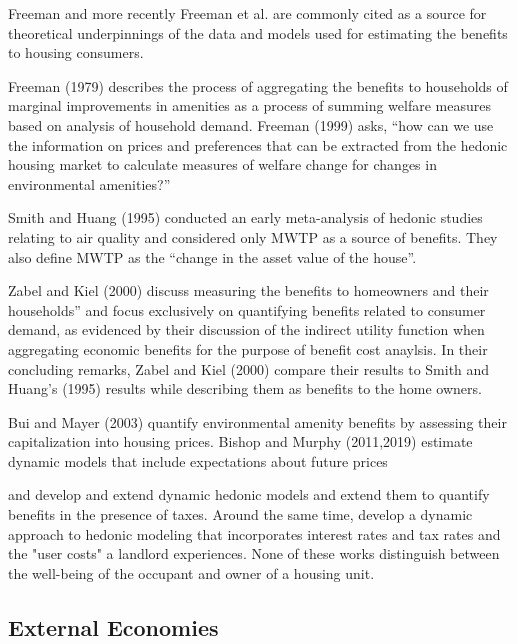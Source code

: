\documentclass[ecta,nameyear,draft]{econsocart}
\theoremstyle{plain}
\theoremstyle{remark}
\begin{document}
Freeman and more recently Freeman et al. are commonly cited as a source for theoretical underpinnings of the data and models used for estimating the benefits to housing consumers.  

Freeman (1979) describes the process of aggregating the benefits to households of marginal improvements in amenities as a process of summing welfare measures based on analysis of household demand. Freeman (1999) asks, “how can we use the information on prices and preferences that can be extracted from the hedonic housing market to calculate  measures of welfare change for changes in environmental amenities?” 



Smith and Huang (1995) conducted an early meta-analysis of hedonic studies relating to air quality and considered only MWTP as a source of benefits. They also define MWTP as the “change in the asset value of the house”. 

Zabel and Kiel (2000) discuss measuring the benefits to homeowners and their households” and focus exclusively on quantifying benefits related to consumer demand, as evidenced by their discussion of the indirect utility function when aggregating economic benefits for the purpose of benefit cost anaylsis. In their concluding remarks, Zabel and Kiel (2000) compare their results to Smith and Huang’s (1995) results while describing them as benefits to the home owners. 

Bui and Mayer (2003) quantify environmental amenity benefits by assessing their capitalization into housing prices. Bishop and Murphy (2011,2019) estimate dynamic models that include expectations about future prices 

\cite{niskanen77} and \cite{freeman80} develop and extend dynamic hedonic models and extend them to quantify benefits in the presence of taxes. Around the same time, \cite{sonstelie80} develop a dynamic approach to hedonic modeling that incorporates interest rates and tax rates and the "user costs" a landlord experiences. None of these works distinguish between the well-being of the occupant and owner of a housing unit.


\subsection{External Economies} 
\end{document}
